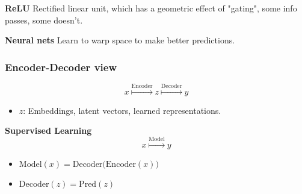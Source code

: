 \documentclass{article}
\begin{document}
\begin{notes} \textbf{ReLU} Rectified linear unit, which has a geometric effect of "gating", some info passes, some doesn't.
\end{notes}

\begin{notes} \textbf{Neural nets} Learn to warp space to make better predictions.
\end{notes}

\subsubsection{Encoder-Decoder view}
\begin{definition}
    \begin{equation}
        x \overset{\text{Encoder}}{\mapsto} z \overset{\text{Decoder}}{\mapsto} y
    \end{equation}
    \begin{itemize}
        \item $z$: Embeddings, latent vectors, learned representations.
    \end{itemize}
\end{definition}

\begin{example} \textbf{Supervised Learning}
    \begin{equation}
        x \overset{\text{Model}}{\mapsto} y
    \end{equation}
    \begin{itemize}
        \item $\mathrm{Model}(x) = \mathrm{Decoder}\bigl(\mathrm{Encoder}(x)\bigr)$
        \item $\mathrm{Decoder}(z) = \mathrm{Pred}(z)$
    \end{itemize}
    
\end{example}
\end{document}
